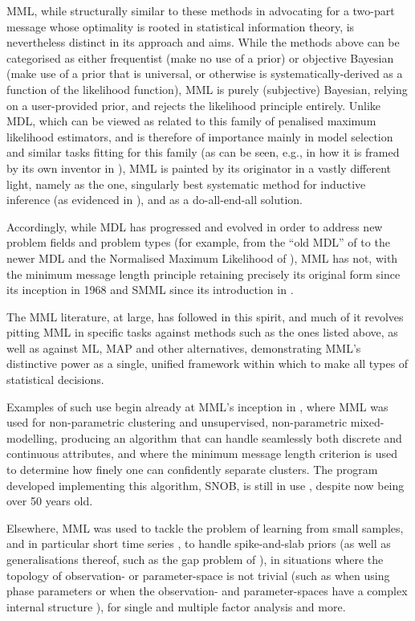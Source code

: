 \documentclass{IEEEtran}
\newcommand{\citet}[1]{\cite{#1}}
\newcommand{\citep}[1]{\cite{#1}}
\begin{document}
MML, while structurally similar to these methods in advocating for a
two-part message whose optimality is rooted in statistical information theory,
is nevertheless distinct in its approach and aims. While the methods above
can be categorised as either frequentist (make no use of a prior) or
objective Bayesian (make use of a prior that is universal, or otherwise is
systematically-derived as a function of the likelihood function), MML is
purely (subjective) Bayesian, relying on a user-provided prior, and rejects
the likelihood principle entirely. Unlike MDL, which can be viewed as
related to this family of penalised maximum likelihood estimators, and is
therefore of importance mainly in model selection and similar tasks
fitting for this family (as can be seen, e.g., in how it is framed by its
own inventor in \citet{rissanen2007information}), MML is painted by its
originator in a vastly different light, namely as the one, singularly best
systematic method for inductive inference (as evidenced in
\citet{Wallace2005}), and as a do-all-end-all solution.

Accordingly, while MDL has progressed and evolved in order to
address new problem fields and problem types (for example, from the
``old MDL'' of \citet{rissanen1989stochastic} to the newer MDL and the
Normalised Maximum Likelihood of \citet{rissanen2007information}), MML has
not, with the minimum message length principle retaining precisely its
original form since its inception in 1968 \citep{WallaceBoulton1968} and
SMML since its introduction in \citet{wallace1975invariant}.

The MML literature, at large, has followed in this spirit, and much of it
revolves pitting MML in specific tasks against methods such as the ones
listed above, as well as against ML, MAP and other alternatives, demonstrating
MML's distinctive power as a single, unified framework within which to make all
types of statistical decisions.

Examples of such use begin already at MML's inception in
\citet{WallaceBoulton1968}, where MML was used for non-parametric clustering
and unsupervised, non-parametric mixed-modelling,
producing an algorithm that can handle seamlessly both discrete and
continuous attributes, and where the minimum message length criterion is
used to determine how finely one can confidently separate clusters. The
program developed implementing this algorithm, SNOB, is still in use
\citep{dale2016environmental, allison2018coding}, despite now being over 50
years old.

Elsewhere, MML was used to tackle the problem of learning from small
samples, and in particular short time series \citep{schmidt2016minimum},
to handle spike-and-slab priors \citep{xu2017bayesian} (as well as
generalisations thereof, such as the gap problem
of \citet{DoweGardnerOppy2007}), in situations where
the topology of observation- or parameter-space is not trivial (such as
when using phase parameters
\citep{WallaceDowe2000,kasarapu2015minimum,dowe1996mml} or
when the observation- and parameter-spaces have a complex internal structure
\citep{ComleyDowe2005}), for single and multiple factor analysis
\cite{EdwardsDowe1998,wallace1995multiple} and more.
\end{document}
